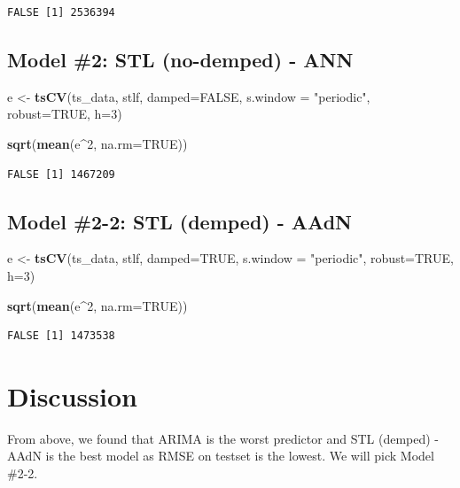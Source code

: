 \documentclass[openany]{book}
\newenvironment{Shaded}{\begin{snugshade}}{\end{snugshade}}
\newcommand{\DataTypeTok}[1]{\textcolor[rgb]{0.13,0.29,0.53}{#1}}
\newcommand{\DecValTok}[1]{\textcolor[rgb]{0.00,0.00,0.81}{#1}}
\newcommand{\KeywordTok}[1]{\textcolor[rgb]{0.13,0.29,0.53}{\textbf{#1}}}
\newcommand{\NormalTok}[1]{#1}
\newcommand{\OperatorTok}[1]{\textcolor[rgb]{0.81,0.36,0.00}{\textbf{#1}}}
\newcommand{\OtherTok}[1]{\textcolor[rgb]{0.56,0.35,0.01}{#1}}
\newcommand{\StringTok}[1]{\textcolor[rgb]{0.31,0.60,0.02}{#1}}
\begin{document}
\begin{verbatim}
FALSE [1] 2536394
\end{verbatim}

\hypertarget{model-2-stl-no-demped---ann-1}{%
\subsection{Model \#2: STL (no-demped) -
ANN}\label{model-2-stl-no-demped---ann-1}}

\begin{Shaded}
\begin{Highlighting}[]
\NormalTok{e <-}\StringTok{ }\KeywordTok{tsCV}\NormalTok{(ts_data, stlf, }\DataTypeTok{damped=}\OtherTok{FALSE}\NormalTok{, }\DataTypeTok{s.window =} \StringTok{"periodic"}\NormalTok{, }\DataTypeTok{robust=}\OtherTok{TRUE}\NormalTok{, }\DataTypeTok{h=}\DecValTok{3}\NormalTok{)}

\KeywordTok{sqrt}\NormalTok{(}\KeywordTok{mean}\NormalTok{(e}\OperatorTok{^}\DecValTok{2}\NormalTok{, }\DataTypeTok{na.rm=}\OtherTok{TRUE}\NormalTok{))}
\end{Highlighting}
\end{Shaded}

\begin{verbatim}
FALSE [1] 1467209
\end{verbatim}

\hypertarget{model-2-2-stl-demped---aadn-1}{%
\subsection{Model \#2-2: STL (demped) -
AAdN}\label{model-2-2-stl-demped---aadn-1}}

\begin{Shaded}
\begin{Highlighting}[]
\NormalTok{e <-}\StringTok{ }\KeywordTok{tsCV}\NormalTok{(ts_data, stlf, }\DataTypeTok{damped=}\OtherTok{TRUE}\NormalTok{, }\DataTypeTok{s.window =} \StringTok{"periodic"}\NormalTok{, }\DataTypeTok{robust=}\OtherTok{TRUE}\NormalTok{, }\DataTypeTok{h=}\DecValTok{3}\NormalTok{)}

\KeywordTok{sqrt}\NormalTok{(}\KeywordTok{mean}\NormalTok{(e}\OperatorTok{^}\DecValTok{2}\NormalTok{, }\DataTypeTok{na.rm=}\OtherTok{TRUE}\NormalTok{))}
\end{Highlighting}
\end{Shaded}

\begin{verbatim}
FALSE [1] 1473538
\end{verbatim}

\hypertarget{discussion}{%
\section{Discussion}\label{discussion}}

From above, we found that ARIMA is the worst predictor and STL (demped)
- AAdN is the best model as RMSE on testset is the lowest. We will pick
Model \#2-2.
\end{document}
